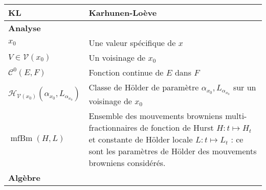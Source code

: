 \begin{table}[H]
\begin{tabularx}{\textwidth}{lX}
		KL                                                               & Karhunen-Loève                                                                                                                                                                                                                    \\
		\midrule
		\textbf{Analyse}                                                 &                                                                                                                                                                                                                                   \\
		\midrule
		$x_0$                                                            & Une valeur spécifique de $x$                                                                                                                                                                                                      \\
		$V \in \mathcal{V}(x_0)$                                               & Un voisinage de $x_0$                                                                                                                                                                                                             \\
		$\mathcal C^0(E, F)$                                             & Fonction continue de $E$ dans $F$                                                                                                                                                                                                 \\
		$\mathcal{H}_{\mathcal{V}(x_0)}(\alpha_{x_0}, L_{\alpha_{x_0}})$ & Classe de Hölder de paramètre $\alpha_{x_0}, L_{\alpha_{x_0}}$ sur un voisinage de $x_0$                                                                                                                                          \\
		$\operatorname{mfBm}(H, L)$                                      & Ensemble des mouvements browniens multi-fractionnaires de fonction de Hurst $H : t \mapsto H_t$ et constante de Hölder locale $L : t \mapsto L_t$ : ce sont les \og paramètres de Hölder \fg des mouvements browniens considérés. \\
		\midrule
		\textbf{Algèbre}                                                 &                                                                                                                                                                                                                                   \\

\end{tabularx}
\end{table}
